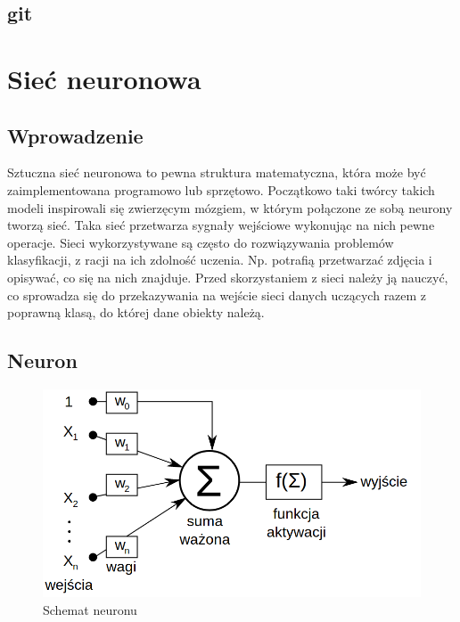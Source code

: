 \documentclass{report}
\begin{document}
    \section{git}

    \chapter{Sieć neuronowa}

    \section{Wprowadzenie}

    Sztuczna sieć neuronowa to pewna struktura matematyczna, która może być zaimplementowana programowo lub sprzętowo.
    Początkowo taki twórcy takich modeli inspirowali się zwierzęcym mózgiem, w którym połączone ze sobą neurony tworzą sieć.
    Taka sieć przetwarza sygnały wejściowe wykonując na nich pewne operacje.
    Sieci wykorzystywane są często do rozwiązywania problemów klasyfikacji, z racji na ich zdolność uczenia.
    Np. potrafią przetwarzać zdjęcia i opisywać, co się na nich znajduje.
    Przed skorzystaniem z sieci należy ją nauczyć, co sprowadza się do przekazywania na wejście sieci danych uczących razem z poprawną klasą, do której dane obiekty należą.

    \section{Neuron}

    \begin{figure}[H]
        \centering
        \includegraphics[scale=0.4]{./img/neuron.png}
        \caption{Schemat neuronu}
    \end{figure}
\end{document}
